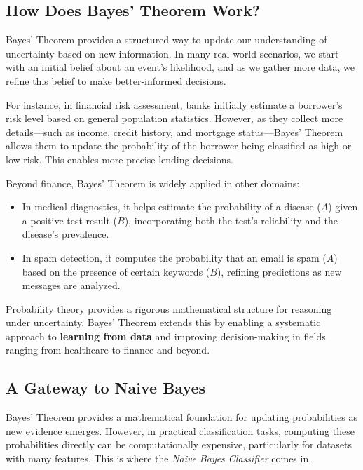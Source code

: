 \documentclass[
  11pt,
]{book}
\providecommand{\tightlist}{%
  \setlength{\itemsep}{0pt}\setlength{\parskip}{0pt}}
\theoremstyle{definition}
\theoremstyle{definition}
\theoremstyle{definition}
\theoremstyle{definition}
\theoremstyle{remark}
\begin{document}
\subsection*{How Does Bayes' Theorem Work?}\label{how-does-bayes-theorem-work}


Bayes' Theorem provides a structured way to update our understanding of uncertainty based on new information. In many real-world scenarios, we start with an initial belief about an event's likelihood, and as we gather more data, we refine this belief to make better-informed decisions.

For instance, in financial risk assessment, banks initially estimate a borrower's risk level based on general population statistics. However, as they collect more details---such as income, credit history, and mortgage status---Bayes' Theorem allows them to update the probability of the borrower being classified as high or low risk. This enables more precise lending decisions.

Beyond finance, Bayes' Theorem is widely applied in other domains:

\begin{itemize}
\tightlist
\item
  In medical diagnostics, it helps estimate the probability of a disease (\(A\)) given a positive test result (\(B\)), incorporating both the test's reliability and the disease's prevalence.\\
\item
  In spam detection, it computes the probability that an email is spam (\(A\)) based on the presence of certain keywords (\(B\)), refining predictions as new messages are analyzed.
\end{itemize}

Probability theory provides a rigorous mathematical structure for reasoning under uncertainty. Bayes' Theorem extends this by enabling a systematic approach to \textbf{learning from data} and improving decision-making in fields ranging from healthcare to finance and beyond.

\subsection*{A Gateway to Naive Bayes}\label{a-gateway-to-naive-bayes}


Bayes' Theorem provides a mathematical foundation for updating probabilities as new evidence emerges. However, in practical classification tasks, computing these probabilities directly can be computationally expensive, particularly for datasets with many features. This is where the \emph{Naive Bayes Classifier} comes in.
\end{document}
